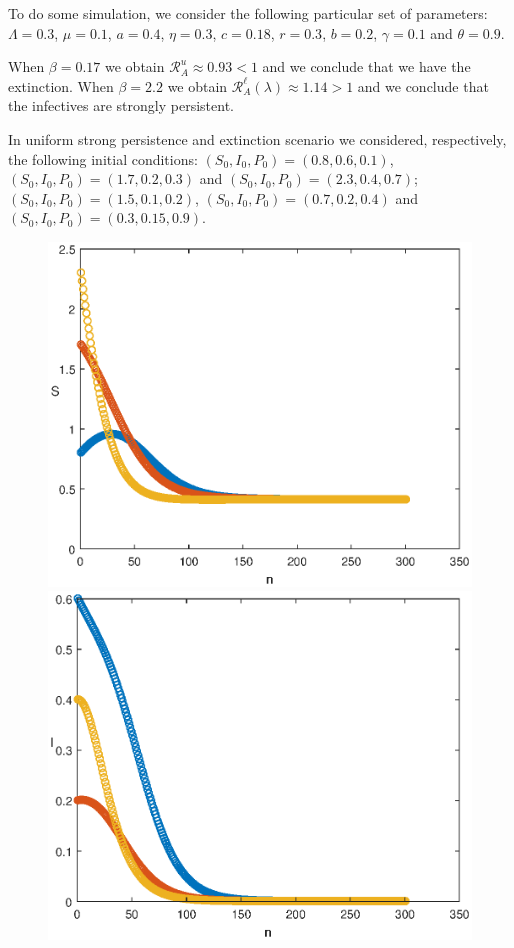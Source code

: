 \documentclass[reqno]{amsart}
\begin{document}
{{To do some simulation, we consider the following particular set of parameters: $\Lambda=0.3$, $\mu=0.1$, $a=0.4$, $\eta=0.3$, $c=0.18$, $r=0.3$, $b=0.2$, $\gamma=0.1$ and $\theta=0.9$.

When $\beta=0.17$ we obtain $\mathcal R_{A}^u\approx 0.93<1$ and we conclude that we have the extinction. When $\beta=2.2$ we obtain $\mathcal R_{A}^\ell(\lambda)\approx 1.14>1$ and we conclude that the infectives are strongly persistent.

In uniform strong persistence and extinction scenario we considered, respectively, the following initial conditions: $(S_0,I_0,P_0)=(0.8,0.6,0.1)$, $(S_0,I_0,P_0)=(1.7,0.2,0.3)$ and $(S_0,I_0,P_0)=(2.3,0.4,0.7)$; $(S_0,I_0,P_0)=(1.5,0.1,0.2)$, $(S_0,I_0,P_0)=(0.7,0.2,0.4)$ and $(S_0,I_0,P_0)=(0.3,0.15,0.9)$.
\begin{figure}
  \begin{minipage}[b]{.32\linewidth}
    \includegraphics[width=\linewidth]{Susceptible_EXT_AUT.eps}
  \end{minipage}
  \begin{minipage}[b]{.32\linewidth}
        \includegraphics[width=\linewidth]{Infected_EXT_AUT.eps}

\end{minipage}
\end{figure}}}
\end{document}
